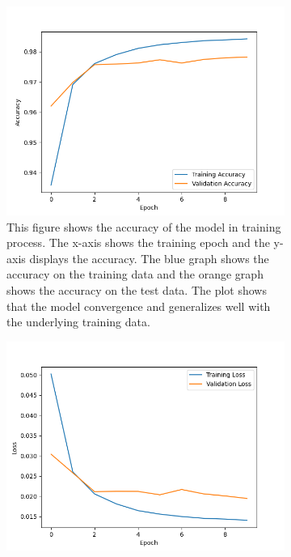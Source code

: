 \begin{figure}[ht!]  
  \centering
  \begin{subfigure}[b]{.47\textwidth}
      \centering
      \includegraphics[width=\linewidth ]{images/M1_ACC_fin.png}
      \caption{This figure shows the accuracy of the model in training process. The x-axis shows the training epoch and the y-axis 
      displays the accuracy. The blue graph shows the accuracy on the training data and the orange graph shows the accuracy on the test data.
    The plot shows that the model convergence and generalizes well with the underlying training data. }
      \label{fig:accM1}
  \end{subfigure}
  \hfill
  \begin{subfigure}[b]{.47\textwidth}
      \centering
      \includegraphics[width=\linewidth, keepaspectratio]{images/M1_Loss_Fin.png}

\end{subfigure}
\end{figure}
